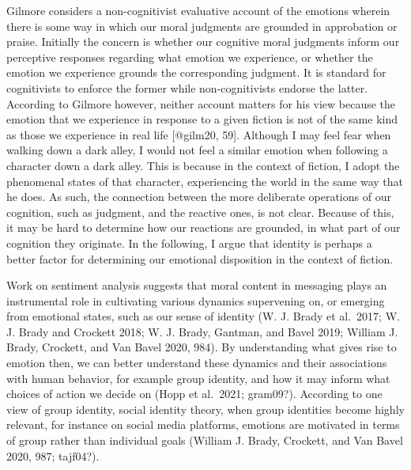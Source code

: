 \documentclass[
  letterpaper,
  DIV=11,
  numbers=noendperiod]{scrartcl}
\theoremstyle{remark}
\begin{document}
Gilmore considers a non-cognitivist evaluative account of the emotions
wherein there is some way in which our moral judgments are grounded in
approbation or praise. Initially the concern is whether our cognitive
moral judgments inform our perceptive responses regarding what emotion
we experience, or whether the emotion we experience grounds the
corresponding judgment. It is standard for cognitivists to enforce the
former while non-cognitivists endorse the latter. According to Gilmore
however, neither account matters for his view because the emotion that
we experience in response to a given fiction is not of the same kind as
those we experience in real life {[}@gilm20, 59{]}. Although I may feel
fear when walking down a dark alley, I would not feel a similar emotion
when following a character down a dark alley. This is because in the
context of fiction, I adopt the phenomenal states of that character,
experiencing the world in the same way that he does. As such, the
connection between the more deliberate operations of our cognition, such
as judgment, and the reactive ones, is not clear. Because of this, it
may be hard to determine how our reactions are grounded, in what part of
our cognition they originate. In the following, I argue that identity is
perhaps a better factor for determining our emotional disposition in the
context of fiction.

Work on sentiment analysis suggests that moral content in messaging
plays an instrumental role in cultivating various dynamics supervening
on, or emerging from emotional states, such as our sense of identity (W.
J. Brady et al.~2017; W. J. Brady and Crockett 2018; W. J. Brady,
Gantman, and Bavel 2019; William J. Brady, Crockett, and Van Bavel 2020,
984). By understanding what gives rise to emotion then, we can better
understand these dynamics and their associations with human behavior,
for example group identity, and how it may inform what choices of action
we decide on (Hopp et al.~2021; gram09?). According to one view of group
identity, social identity theory, when group identities become highly
relevant, for instance on social media platforms, emotions are motivated
in terms of group rather than individual goals (William J. Brady,
Crockett, and Van Bavel 2020, 987; tajf04?).
\end{document}
